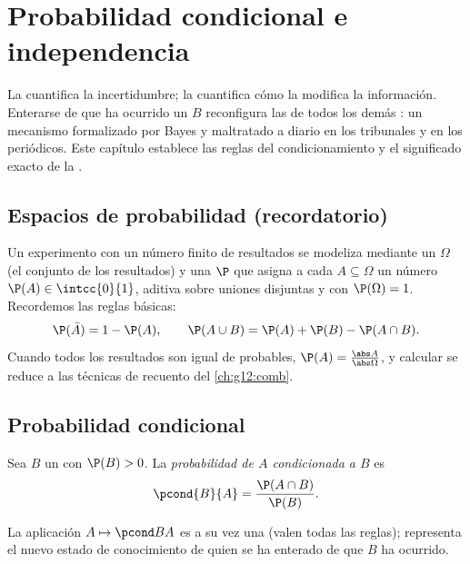 \chapter{Probabilidad condicional e independencia}\label{ch:g12:condprob}

La  cuantifica la incertidumbre; la 
cuantifica cómo la modifica la información. Enterarse de que ha ocurrido un
 $B$ reconfigura las  de todos los demás : un
mecanismo formalizado por Bayes y maltratado a diario en los tribunales y
en los periódicos. Este capítulo establece las reglas del condicionamiento
y el significado exacto de la .

\section{Espacios de probabilidad (recordatorio)}

Un experimento con un número finito de resultados se modeliza mediante un
\emph{} $\Omega$ (el conjunto de los resultados) y una
 $\P$ que asigna a cada  $A \subseteq \Omega$ un número
$\P(A) \in \intcc{0}{1}$, aditiva sobre uniones disjuntas y con
$\P(\Omega) = 1$. Recordemos las reglas básicas:
\[
\P(\bar A) = 1 - \P(A),
\qquad
\P(A \cup B) = \P(A) + \P(B) - \P(A \cap B).
\]
Cuando todos los resultados son igual de probables,
$\P(A) = \frac{\abs A}{\abs\Omega}$, y calcular  se reduce a
las técnicas de recuento del \cref{ch:g12:comb}.

\section{Probabilidad condicional}

\begin{definition}\label{def:g12:condprob:cond}
Sea $B$ un  con $\P(B) > 0$. La \emph{probabilidad de $A$ condicionada
a $B$} es
\[
\pcond{B}{A} = \frac{\P(A \cap B)}{\P(B)} .
\]
\end{definition}

La aplicación $A \mapsto \pcond BA$ es a su vez una  (valen
todas las reglas); representa el nuevo estado de conocimiento de quien se
ha enterado de que $B$ ha ocurrido.


